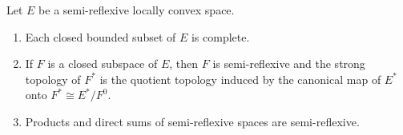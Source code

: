 Let $E$ be a semi-reflexive locally convex space.
\begin{enumerate}
\item[(i)] Each closed bounded subset of $E$ is complete.
\item[(ii)] If $F$ is a closed subspace of $E$, then $F$ is semi-reflexive and the strong topology of $F^*$ is the quotient topology induced by the canonical map of $E^*$ onto $F^* \cong E^* / F^0$.
\item[(iii)] Products and direct sums of semi-reflexive spaces are semi-reflexive.
\end{enumerate}
